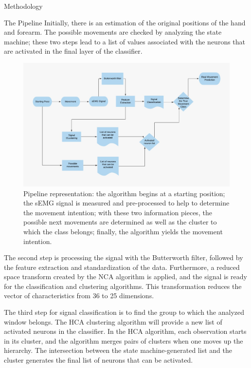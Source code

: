 \documentclass[a4paper, 12pt]{ppgeb}
\makeatletter
\renewcommand{\section}{\@startsection
{section}
{1}
{0mm}
{-\baselineskip}
{0.5\baselineskip}
{\large\bfseries\scshape}}
\renewcommand{\subsection}{\@startsection
{subsection}
{2}
{0mm}
{-\baselineskip}
{0.5\baselineskip}
{\bf\sffamily}}
\makeatother
\begin{document}
\section{Methodology}

\subsection{The Pipeline}
Initially, there is an estimation of the original positions of the hand and forearm. The possible movements are checked by analyzing the state machine; these two steps lead to a list of values associated with the neurons that are activated in the final layer of the classifier.

\begin{figure}[h]
    \begin{center}
	\includegraphics[width=.8\linewidth]{sMEG_Classification_Fluxogram.png}
	\end{center}
	\caption{Pipeline representation: the algorithm begins at a starting position; the \ac{sEMG} signal is measured and pre-processed to help to determine the movement intention; with these two information pieces, the possible next movements are determined as well as the cluster to which the class belongs; finally, the algorithm yields the movement intention.} \label{fig_class_fluxo}
\end{figure}

The second step is processing the signal with the Butterworth filter, followed by the feature extraction and standardization of the data. Furthermore, a reduced space transform created by the \ac{NCA} algorithm is applied, and the signal is ready for the classification and clustering algorithms. This transformation reduces the vector of characteristics from 36 to 25 dimensions.

The third step for signal classification is to find the group to which the analyzed window belongs. The \ac{HCA} clustering algorithm will provide a new list of activated neurons in the classifier. In the \ac{HCA} algorithm, each observation starts in its cluster, and the algorithm merges pairs of clusters when one moves up the hierarchy. The intersection between the state machine-generated list and the cluster generates the final list of neurons that can be activated.
\end{document}
